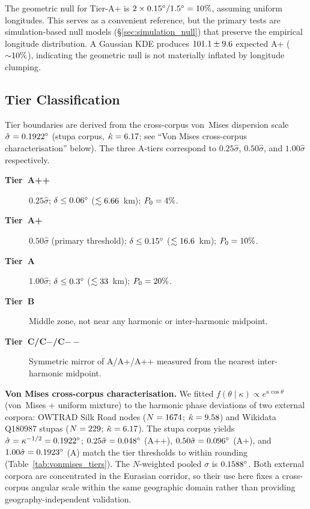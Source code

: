 The geometric null for Tier-A+ is $2 \times \ApThreshDeg{}\textdegree{} / 1.5\textdegree{} = \NullRateApPct{}\%$,
assuming uniform longitudes. This serves as a convenient reference, but
the primary tests are simulation-based null models (\S\ref{sec:simulation_null})
that preserve the empirical longitude distribution. A Gaussian KDE produces
$101.1 \pm 9.6$ expected A+ (${\sim}10{}\%$), indicating the
geometric null is not materially inflated by longitude clumping.


\subsection{Tier Classification}
\label{sec:tier_classification}

Tier boundaries are derived from the cross-corpus von~Mises dispersion scale
$\hat{\sigma} = \vmSigmaDegStupa{}\textdegree{}$ (stupa corpus, $\hat{\kappa} = 6.17{}$;
see ``Von Mises cross-corpus characterisation'' below).
The three A-tiers correspond to $0.25\hat{\sigma}$, $0.50\hat{\sigma}$, and
$1.00\hat{\sigma}$ respectively.

\begin{description}
  \item[\textbf{Tier~A++}] $0.25\hat{\sigma}$;\quad
    $\delta \leq \AppThreshDeg{}\textdegree{}$ ($\lesssim6.66{}$~km); $P_0 = 4\%{}$.
  \item[\textbf{Tier~A+}] $0.50\hat{\sigma}$ (primary threshold);\quad
    $\delta \leq \ApThreshDeg{}\textdegree{}$ ($\lesssim16.6{}$~km); $P_0 = 10\%{}$.
  \item[\textbf{Tier~A}] $1.00\hat{\sigma}$;\quad
    $\delta \leq \ATierThreshDeg{}\textdegree{}$ ($\lesssim33{}$~km); $P_0 = 20\%{}$.
  \item[\textbf{Tier~B}] Middle zone, not near any harmonic or inter-harmonic midpoint.
  \item[\textbf{Tier~C/C$-$/C$--$}] Symmetric mirror of A/A+/A++ measured from the
    nearest inter-harmonic midpoint.
\end{description}

\textbf{Von Mises cross-corpus characterisation.}
We fitted $f(\theta \mid \kappa) \propto e^{\kappa\cos\theta}$ (von~Mises + uniform
mixture) to the harmonic phase deviations of two external corpora:
OWTRAD Silk Road nodes ($N = 1674{}$; $\hat{\kappa} = 9.58{}$) and
Wikidata Q180987 stupas ($N = 229{}$; $\hat{\kappa} = 6.17{}$).
The stupa corpus yields $\hat{\sigma} = \kappa^{-1/2} = \vmSigmaDegStupa{}\textdegree{}$;
$0.25\hat{\sigma} = \vmHalfSigmaDegStupa{}\textdegree{}$ (A++),
$0.50\hat{\sigma} = \vmOneSigmaDegStupa{}\textdegree{}$ (A+),
and $1.00\hat{\sigma} = \vmTwoSigmaDegStupa{}\textdegree{}$ (A)
match the tier thresholds to within rounding (Table~\ref{tab:vonmises_tiers}).
The $N$-weighted pooled $\hat{\sigma}$ is $\vmSigmaDegPooled{}\textdegree{}$.
Both external corpora are concentrated in the Eurasian corridor, so
their use here fixes a cross-corpus angular scale within the same
geographic domain rather than providing geography-independent
validation.

